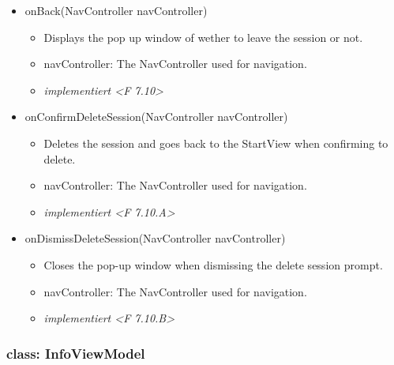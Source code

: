 \documentclass[oneside, ngerman]{sdqtechreport}
\begin{document}
\begin{itemize}
\begin{itemize}
        \end{itemize}
    \item onBack(NavController navController)
        \begin{itemize}
            \item Displays the pop up window of wether to leave the session or not.
            \item navController: The NavController used for navigation.
            \item \textit{implementiert <F 7.10>}
        \end{itemize}
    \item onConfirmDeleteSession(NavController navController)
        \begin{itemize}
            \item Deletes the session and goes back to the StartView when confirming to delete.
            \item navController: The NavController used for navigation.
            \item \textit{implementiert <F 7.10.A>}
        \end{itemize}
    \item onDismissDeleteSession(NavController navController)
        \begin{itemize}
            \item Closes the pop-up window when dismissing the delete session prompt.
            \item navController: The NavController used for navigation.
            \item \textit{implementiert <F 7.10.B>}
        \end{itemize}
\end{itemize}



\subsubsection{class: InfoViewModel}
\end{document}
